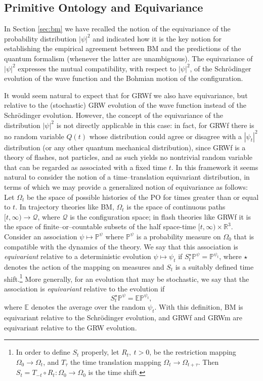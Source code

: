 \documentclass[12pt]{article}
\newcommand{\conf}{\mathcal{Q}}
\newcommand{\Q}{\conf}
\newcommand{\EEE}{\mathbb{E}}
\newcommand{\PPP}{\mathbb{P}}
\newcommand{\RRR}{\mathbb{R}}
\begin{document}
\subsection{Primitive Ontology and Equivariance}
\label{subsec:poae}

In Section \ref{sec:bm} we have recalled the notion of the equivariance of
the probability distribution $|\psi|^2$ and indicated how it is the key
notion for establishing the empirical agreement between {\sf BM} and the
predictions of the quantum formalism (whenever the latter are unambiguous).
The equivariance of $|\psi|^2$ expresses the mutual compatibility,
with respect to $|\psi|^2$, of the Schr\"odinger
evolution of the wave function and the Bohmian motion of the configuration.

It would seem natural to expect that for {\sf GRWf} we also have
equivariance, but relative to the (stochastic) {\sf GRW} evolution of the
wave function instead of the Schr\"odinger evolution. However, the concept
of the equivariance of the distribution $|\psi|^2$ is not directly
applicable in this case: in fact, for {\sf GRWf} there is no random
variable $Q(t)$ whose distribution could agree or disagree with a
$|\psi_t|^2$ distribution (or any other quantum mechanical distribution),
since {\sf GRWf} is a theory of flashes, not particles, and as such yields
no nontrivial random variable that can be regarded as associated with a
fixed time $t$.  In this framework it seems natural to consider the notion
of a time--translation equivariant distribution, in terms of which we may
provide a generalized notion of equivariance as follows: Let $\Omega_t$ be
the space of possible histories of the PO for times greater than or equal
to $t$. In trajectory theories like {\sf BM}, $\Omega_t$ is the space of
continuous paths $[t,\infty) \to \Q$, where $\Q$ is the configuration
space; in flash theories like {\sf GRWf} it is the space of
finite--or--countable subsets of the half space-time $[t,\infty) \times
\RRR^3$.
Consider an association $\psi \mapsto \PPP^{\psi}$ where
$\PPP^{\psi}$ is a probability measure on $\Omega_0$ that is compatible
with the dynamics of the theory.  We say that this association is
\textit{equivariant} relative to a deterministic evolution $\psi \mapsto
\psi_t$ if $S_t^{\star} \PPP^{\psi} = \PPP^{\psi_t}$, where ${\star}$
denotes the action of the mapping on measures and $S_t$ is a suitably defined time shift.\footnote{In order to define $S_t$ properly, let $R_t,\ t>0$, be the restriction mapping $\Omega_0 \to
\Omega_t$, and $T_{\tau}$ the time translation mapping $\Omega_t \to
\Omega_{t+\tau}$. Then $S_t = T_{-t} \circ R_t : \Omega_0 \to \Omega_0$ is
the time shift.}
More generally, for an
evolution that may be stochastic, we say that the association is
\textit{equivariant} relative to the evolution if
\begin{equation}S_t^{\star} \PPP^{\psi} = \EEE \PPP^{\psi_t},\end{equation}
 where $\EEE$ denotes the average over the random $\psi_t$. 
With this definition, {\sf BM} is equivariant relative to the Schr\"odinger evolution, and {\sf GRWf} and {\sf GRWm} are equivariant relative to the {\sf GRW} evolution.
\end{document}
